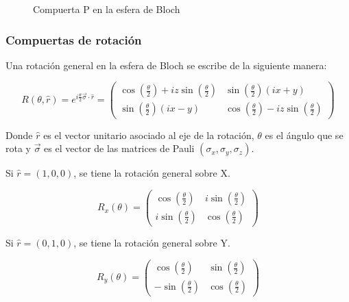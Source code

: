 \begin{figure}[H]
    \center
    \begin{blochsphere}[radius=1.5cm,tilt=15,rotation=-20,opacity=0.05]


    \end{blochsphere}
    \caption{Compuerta P en la esfera de Bloch}
    \label{fig:blochp}
\end{figure}

\subsubsection{Compuertas de rotación}

Una rotación general en la esfera de Bloch se escribe de la siguiente manera:

\[
R(\theta,\hat{r}) = e^{i \frac{\theta}{2} \vec{\sigma} \cdot \hat{r}} =
\begin{pmatrix}
\cos(\frac{\theta}{2}) + i z \sin(\frac{\theta}{2}) & \sin(\frac{\theta}{2}) (i x + y) \\
\sin(\frac{\theta}{2}) (i x - y) & \cos(\frac{\theta}{2}) - i z \sin(\frac{\theta}{2})
\end{pmatrix}
\]

Donde $\hat{r}$ es el vector unitario asociado al eje de la rotación, $\theta$ es el ángulo que se rota y $\vec{\sigma}$ es el vector de las matrices de Pauli $(\sigma_x, \sigma_y, \sigma_z)$.

Si $\hat{r} = (1,0,0)$, se tiene la rotación general sobre X.

\[
R_x(\theta) =
\begin{pmatrix}
\cos(\frac{\theta}{2}) & i \sin(\frac{\theta}{2}) \\
i\sin(\frac{\theta}{2}) & \cos(\frac{\theta}{2})
\end{pmatrix}
\]

Si $\hat{r} = (0,1,0)$, se tiene la rotación general sobre Y.

\[
R_y(\theta) =
\begin{pmatrix}
\cos(\frac{\theta}{2}) & \sin(\frac{\theta}{2}) \\
-\sin(\frac{\theta}{2}) & \cos(\frac{\theta}{2})
\end{pmatrix}
\]

